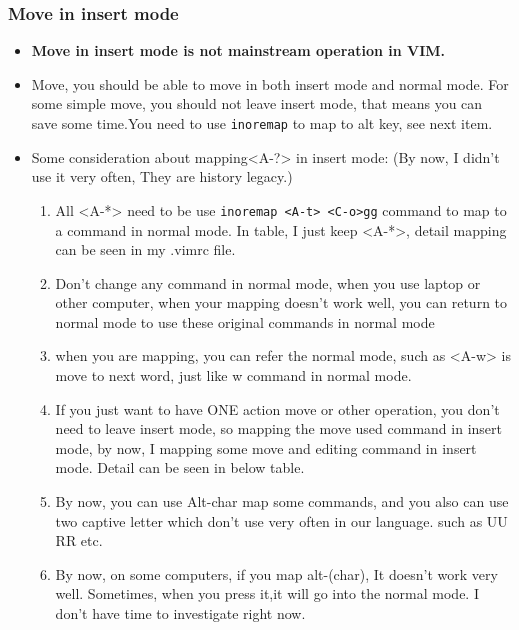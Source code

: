 \documentclass[a4paper,12pt,twoside]{book}
\begin{document}
\subsubsection{Move in insert mode}
\begin{itemize}
		\item \textbf{Move in insert mode is not mainstream operation in VIM.}

		\item Move, you should be able to move in both insert mode and normal mode. For some simple move, you should not leave insert mode, that means you can save some time.You need to use \verb!inoremap! to map to alt key, see next item.  

		\item Some consideration about mapping<A-?> in insert mode: (By now, I didn't use it very often, They are history legacy.)
			\begin{enumerate}
					\item All <A-*> need to be use \verb!inoremap <A-t> <C-o>gg! command to map to a command in normal mode. In table, I just keep <A-*>, detail mapping can be seen in my .vimrc file. 

					\item Don't change any command in normal mode, when you use laptop or other computer, when your mapping doesn't work well, you can return to normal mode to use these original commands in normal mode

					\item when you are mapping, you can refer the normal mode, such as <A-w> is move to next word, just like w command in normal mode.

					\item If you just want to have ONE action move or other operation, you don't need to leave insert mode, so mapping the move used command in insert mode, by now, I mapping some move and editing command in insert mode. Detail can be seen in below table.

					\item By now, you can use Alt-char map some commands, and you also can use two captive letter which don't use very often in our language. such as UU RR etc. 

					\item By now, on some computers, if you map alt-(char), It doesn't work very well. Sometimes, when you press it,it will go into the normal mode. I don't have time to investigate right now. 
			\end{enumerate}
\end{itemize}
\end{document}
